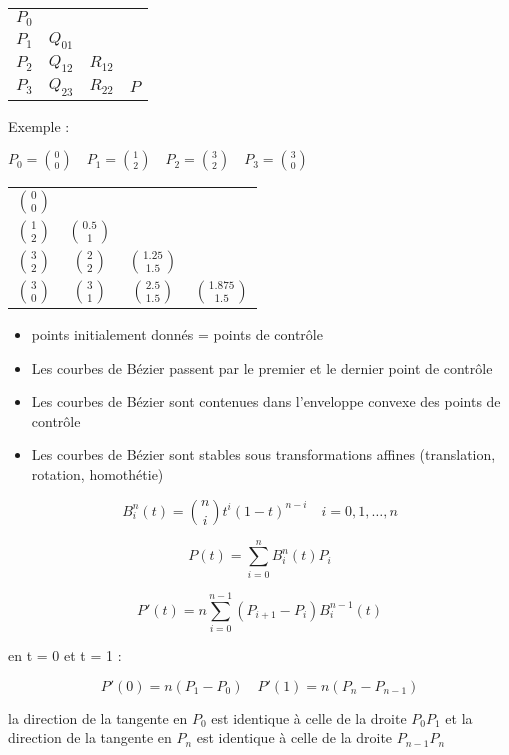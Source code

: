 
\begin{tabular}{c c c c}
    $P_0$ & & & \\
    $P_1$ & $Q_{01}$ & & \\
    $P_2$ & $Q_{12}$ & $R_{12}$ & \\
    $P_3$ & $Q_{23}$ & $R_{22}$ & $P$ \\


\end{tabular}

Exemple : 

$P_0 = \binom{0}{0} \quad P_1 = \binom{1}{2} \quad P_2 = \binom{3}{2} \quad P_3 = \binom{3}{0}$

\begin{tabular}{c c c c}
    $\binom{0}{0}$ & & & \\
    $\binom{1}{2}$ & $\binom{0.5}{1}$ & & \\
    $\binom{3}{2}$ & $\binom{2}{2}$ & $\binom{1.25}{1.5}$ & \\
    $\binom{3}{0}$ & $\binom{3}{1}$ & $\binom{2.5}{1.5}$ & $\binom{1.875}{1.5}$ \\
\end{tabular}




\begin{itemize}
    \item points initialement donnés = points de contrôle
    \item Les courbes de Bézier passent par le premier et le dernier point de contrôle
    \item Les courbes de Bézier sont contenues dans l'enveloppe convexe des points de contrôle
    \item Les courbes de Bézier sont stables sous transformations affines (translation, rotation, homothétie)
\end{itemize}


$$B_i^n(t) = \binom{n}{i}t^i(1-t)^{n-i} \quad i = 0,1, \dots, n$$


$$P(t) = \sum_{i=0}^{n} B_i^n(t)P_i$$


$$ P'(t) = n \sum_{i=0}^{n-1} (P_{i+1} - P_i) B_i^{n-1}(t)$$

en t = 0 et t = 1 :

$$ P'(0) = n(P_1 - P_0) \quad P'(1) = n(P_n - P_{n-1})$$

la direction de la tangente en $P_0$ est identique à celle de la droite $P_0P_1$
et la direction de la tangente en $P_n$ est identique à celle de la droite $P_{n-1}P_n$